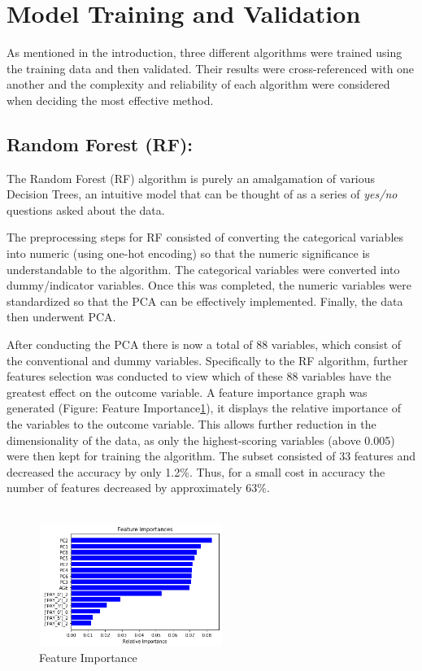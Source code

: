 \documentclass{article}
\begin{document}
\section{Model Training and Validation}
As mentioned in the introduction, three different algorithms were trained using the training data and then validated. Their results were cross-referenced with one another and the complexity and reliability of each algorithm were considered when deciding the most effective method.
\subsection{Random Forest (RF):}
The Random Forest (RF) algorithm is purely an amalgamation of various Decision Trees\cite{h2o}, an intuitive model that can be thought of as a series of \textit{yes/no} questions asked about the data.

The preprocessing steps for RF consisted of converting the categorical variables into numeric (using one-hot encoding) so that the numeric significance is understandable to the algorithm. The categorical variables were converted into dummy/indicator variables. Once this was completed, the numeric variables were standardized so that the PCA can be effectively implemented. Finally, the data then underwent PCA. 

After conducting the PCA there is now a total of 88 variables, which consist of the conventional and dummy variables. Specifically to the RF algorithm, further features selection was conducted to view which of these 88 variables have the greatest effect on the outcome variable. A feature importance graph  was generated (Figure: Feature Importance\ref{fig:feature-Importance}), it displays the relative importance of the variables to the outcome variable. This allows further reduction in the dimensionality of the data, as only the highest-scoring variables (above 0.005) were then kept for training the algorithm. The subset consisted of 33 features and decreased the accuracy by only 1.2\%. Thus, for a small cost in accuracy the number of features decreased by approximately 63\%.\\ \\
\begin{figure}[h]
 \centering
 \includegraphics[width=6cm, height=4cm]{feature-importance.png}
 \caption{Feature Importance}
 \label{fig:feature-Importance}
\end{figure}
\end{document}
